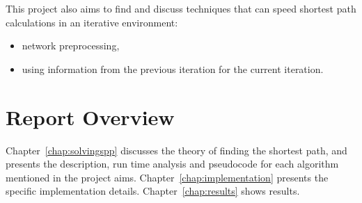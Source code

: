 This project also aims to find and discuss techniques that can speed shortest path calculations in an iterative environment:
\begin{itemize}
    \item network preprocessing,
    \item using information from the previous iteration for the current iteration.
\end{itemize}

\section{Report Overview}
Chapter~\ref{chap:solvingspp} discusses the theory of finding the shortest path,
and presents the description, run time analysis and pseudocode for each algorithm mentioned in the project aims.
Chapter~\ref{chap:implementation} presents the specific implementation details.
Chapter~\ref{chap:results} shows results.


